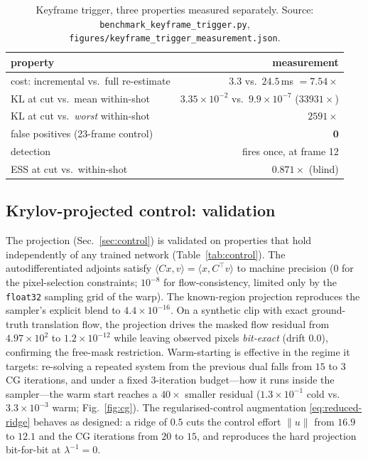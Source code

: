 \begin{table}[t]
  \centering
  \small
  \begin{tabular}{lr}
    \toprule
    property & measurement\\
    \midrule
    cost: incremental vs.\ full re-estimate      & $3.3$ vs.\ $24.5$\,ms $=\mathbf{7.54\times}$\\
    KL at cut vs.\ mean within-shot              & $3.35\!\times\!10^{-2}$ vs.\ $9.9\!\times\!10^{-7}$ ($33931\times$)\\
    KL at cut vs.\ \emph{worst} within-shot      & $2591\times$\\
    false positives (23-frame control)           & $\mathbf{0}$\\
    detection                                    & fires once, at frame 12\\
    ESS at cut vs.\ within-shot                  & $0.871\times$ (blind)\\
    \bottomrule
  \end{tabular}
  \caption{Keyframe trigger, three properties measured separately. Source:
  \texttt{benchmark\_keyframe\_trigger.py},
  \texttt{figures/keyframe\_trigger\_measurement.json}.}
  \label{tab:keyframe}
\end{table}

\subsection{Krylov-projected control: validation}
\label{sec:control-results}
The projection (Sec.~\ref{sec:control}) is validated on properties that hold
independently of any trained network (Table~\ref{tab:control}). The
autodifferentiated adjoints satisfy $\langle Cx,v\rangle=\langle x,C^{\!\top}v\rangle$
to machine precision ($0$ for the pixel-selection constraints; $10^{-8}$ for
flow-consistency, limited only by the \texttt{float32} sampling grid of the warp).
The known-region projection reproduces the sampler's explicit blend to
$4.4\times10^{-16}$. On a synthetic clip with exact ground-truth translation flow,
the projection drives the masked flow residual from $4.97\times10^{2}$ to
$1.2\times10^{-12}$ while leaving observed pixels \emph{bit-exact} (drift $0.0$),
confirming the free-mask restriction. Warm-starting is effective in the regime it
targets: re-solving a repeated system from the previous dual falls from $15$ to
$3$ CG iterations, and under a fixed $3$-iteration budget---how it runs inside the
sampler---the warm start reaches a $40\times$ smaller residual ($1.3\times10^{-1}$
cold vs.\ $3.3\times10^{-3}$ warm; Fig.~\ref{fig:cg}). The regularised-control
augmentation \eqref{eq:reduced-ridge} behaves as designed: a ridge of $0.5$ cuts
the control effort $\|u\|$ from $16.9$ to $12.1$ and the CG iterations from $20$
to $15$, and reproduces the hard projection bit-for-bit at $\lambda^{-1}{=}0$.

